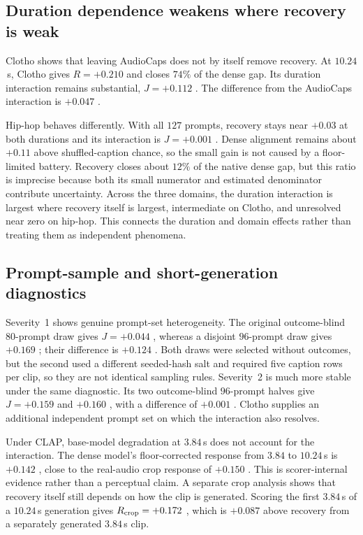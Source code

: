 \subsection{Duration dependence weakens where recovery is weak}
Clotho shows that leaving AudioCaps does not by itself remove recovery. At $10.24$\,s, Clotho gives $R=+0.210$  and closes $74\%$ of the dense gap. Its duration interaction remains substantial, $J=+0.112$ . The difference from the AudioCaps interaction is $+0.047$ .

Hip-hop behaves differently. With all $127$ prompts, recovery stays near $+0.03$ at both durations and its interaction is $J=+0.001$ . Dense alignment remains about $+0.11$ above shuffled-caption chance, so the small gain is not caused by a floor-limited battery. Recovery closes about $12\%$ of the native dense gap, but this ratio is imprecise because both its small numerator and estimated denominator contribute uncertainty. Across the three domains, the duration interaction is largest where recovery itself is largest, intermediate on Clotho, and unresolved near zero on hip-hop. This connects the duration and domain effects rather than treating them as independent phenomena.

\subsection{Prompt-sample and short-generation diagnostics}
Severity~1 shows genuine prompt-set heterogeneity. The original outcome-blind $80$-prompt draw gives $J=+0.044$ , whereas a disjoint $96$-prompt draw gives $+0.169$ ; their difference is $+0.124$ . Both draws were selected without outcomes, but the second used a different seeded-hash salt and required five caption rows per clip, so they are not identical sampling rules. Severity~2 is much more stable under the same diagnostic. Its two outcome-blind $96$-prompt halves give $J=+0.159$  and $+0.160$ , with a difference of $+0.001$ . Clotho supplies an additional independent prompt set on which the interaction also resolves.

Under CLAP, base-model degradation at $3.84$\,s does not account for the interaction. The dense model's floor-corrected response from $3.84$ to $10.24$\,s is $+0.142$ , close to the real-audio crop response of $+0.150$ . This is scorer-internal evidence rather than a perceptual claim. A separate crop analysis shows that recovery itself still depends on how the clip is generated. Scoring the first $3.84$\,s of a $10.24$\,s generation gives $R_{\rm crop}=+0.172$ , which is $+0.087$  above recovery from a separately generated $3.84$\,s clip.

